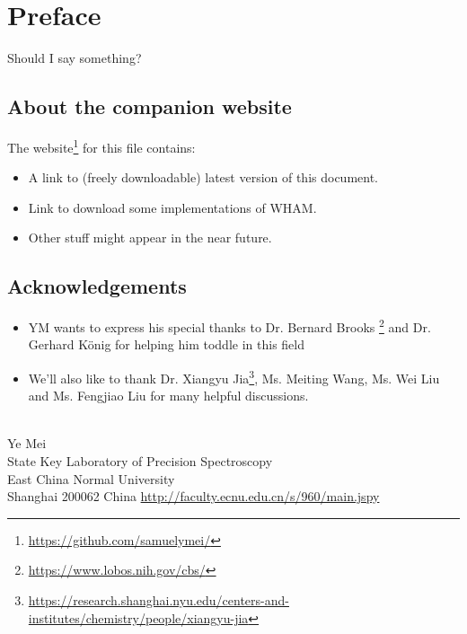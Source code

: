 \chapter*{Preface}
Should I say something?

\section*{About the companion website}
The website\footnote{\url{https://github.com/samuelymei/}} for this file contains:
\begin{itemize}
  \item A link to (freely downloadable) latest version of this document.
  \item Link to download some implementations of WHAM.
  \item Other stuff might appear in the near future.
\end{itemize}

\section*{Acknowledgements}
\begin{itemize}
\item YM wants to express his special thanks to Dr. Bernard Brooks \footnote{\url{https://www.lobos.nih.gov/cbs/}} and Dr. Gerhard K\"onig for helping him toddle in this field
\item We'll also like to thank Dr. Xiangyu Jia\footnote{\url{https://research.shanghai.nyu.edu/centers-and-institutes/chemistry/people/xiangyu-jia}}, Ms. Meiting Wang, Ms. Wei Liu and Ms. Fengjiao Liu for many helpful discussions.
\end{itemize}
\mbox{}\\
\noindent Ye Mei \\
\noindent State Key Laboratory of Precision Spectroscopy\\
\noindent East China Normal University\\
\noindent Shanghai 200062 China
\noindent \url{http://faculty.ecnu.edu.cn/s/960/main.jspy}